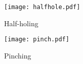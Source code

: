 \vfill

\begin{figure}
	\centering
	\begin{minipage}{0.9\textwidth}
	\centering
	\texttt{[image: halfhole.pdf]}
	\caption{Half-holing} \label{fig:half-holing}
	\texttt{[image: pinch.pdf]}
	\caption{Pinching} \label{fig:pinching}
	\end{minipage}
\end{figure}

